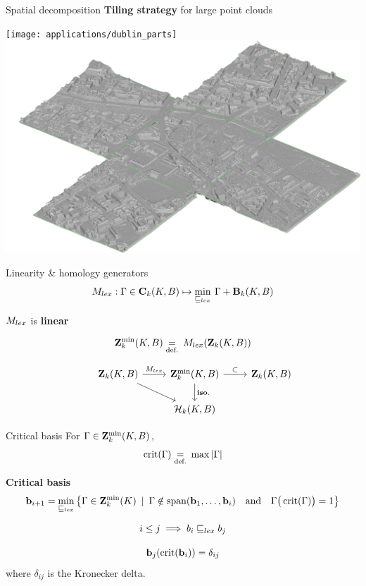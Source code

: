 \begin{frame}{Spatial decomposition}
	\textbf{Tiling strategy} for large point clouds
	\begin{center}
		\texttt{[image: applications/dublin\_parts]}
		\includegraphics[width=0.45\linewidth]{applications/terrain_multipart}
	\end{center}
\end{frame}

\begin{frame}{Linearity \& homology generators}
	\small
	\[
		M_{lex} : \Gamma \in \mathbf{C}_k(K, B) \mapsto \min_{\sqsubseteq_{lex}} \: \Gamma + \mathbf{B}_{k}(K, B)
	\]
	
	$M_{lex}$ is \textbf{linear}
	
	\[
	\mathbf{Z}^{\min}_k(K,B) \underset{\text{def.}}{=} \: M_{lex}(\mathbf{Z}_k(K, B))
	\]
	
	\[
		\begin{tikzcd}[ampersand replacement=\&]
			\& \Zchains_k(K, B) \ar{dr} \arrow{r}{\Mlex} \& \ZchainMin_k (K,B) \ar{d}{\mathbf{iso.}} \arrow{r}{\subset } \& \Zchains_k(K, B) \\
			\&\& \Homol_k(K,B) 
		\end{tikzcd}
	\]
\end{frame}

\begin{frame}{Critical basis}
	\small	
	For $\Gamma \in \mathbf{Z}^{\min}_k(K,B)$,
	\[
	\operatorname{crit}(\Gamma) \underset{\text{def.}}{=} \: \max | \Gamma |
	\]
	
	\pause
	\textbf{Critical basis}
	\begin{equation*}
		\mathbf{b}_{i+1} = \min_{\sqsubseteq_{lex}} \left\{  \Gamma \in  \mathbf{Z}^{\min}_k(K) \: \mid \:   \Gamma \notin \operatorname{span}(  \mathbf{b}_1, \ldots , \mathbf{b}_i )  \quad \textrm{and} \quad  \Gamma\big(\operatorname{crit}(\Gamma)\big)= 1 \right\}
	\end{equation*}
	
	\pause
	\[ 
	i \leq j \implies b_i \sqsubseteq_{lex} b_j
	\]
	
	\pause
	\[
	\mathbf{b}_j ( \operatorname{crit}( \mathbf{b}_i ) ) =  \delta_{ij}
	\]
	where $\delta_{ij}$ is the Kronecker delta. 
\end{frame}

